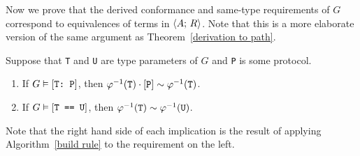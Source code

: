 \documentclass[../generics]{subfiles}
\begin{document}
Now we prove that the derived conformance and same-type requirements of $G$ correspond to equivalences of terms in $\langle A;\,R\rangle$. Note that this is a more elaborate version of the same argument as Theorem~\ref{derivation to path}.
\begin{theorem}
Suppose that \texttt{T} and \texttt{U} are type parameters of $G$ and \texttt{P} is some protocol.
\begin{enumerate}
\item If $G\vDash[\texttt{T:~P}]$, then $\varphi^{-1}(\texttt{T})\cdot[\texttt{P}]\sim\varphi^{-1}(\texttt{T})$.
\item If $G\vDash[\texttt{T == U}]$, then $\varphi^{-1}(\texttt{T})\sim\varphi^{-1}(\texttt{U})$.
\end{enumerate}
Note that the right hand side of each implication is the result of applying Algorithm~\ref{build rule} to the requirement on the left.
\end{theorem}
\end{document}

